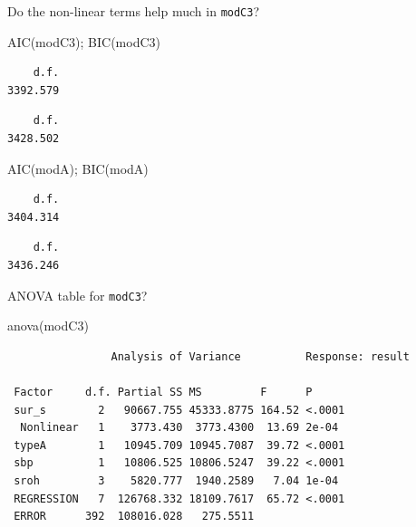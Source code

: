 \documentclass[
  ignorenonframetext,
]{beamer}
\newenvironment{Shaded}{\begin{snugshade}}{\end{snugshade}}
\newcommand{\FunctionTok}[1]{\textcolor[rgb]{0.00,0.00,0.00}{#1}}
\newcommand{\NormalTok}[1]{#1}
\begin{document}
\begin{frame}[fragile]{Do the non-linear terms help much in
\texttt{modC3}?}
\protect\hypertarget{do-the-non-linear-terms-help-much-in-modc3}{}
\begin{Shaded}
\begin{Highlighting}[]
\FunctionTok{AIC}\NormalTok{(modC3); }\FunctionTok{BIC}\NormalTok{(modC3)}
\end{Highlighting}
\end{Shaded}

\begin{verbatim}
    d.f. 
3392.579 
\end{verbatim}

\begin{verbatim}
    d.f. 
3428.502 
\end{verbatim}

\begin{Shaded}
\begin{Highlighting}[]
\FunctionTok{AIC}\NormalTok{(modA); }\FunctionTok{BIC}\NormalTok{(modA)}
\end{Highlighting}
\end{Shaded}

\begin{verbatim}
    d.f. 
3404.314 
\end{verbatim}

\begin{verbatim}
    d.f. 
3436.246 
\end{verbatim}
\end{frame}

\begin{frame}[fragile]{ANOVA table for \texttt{modC3}?}
\protect\hypertarget{anova-table-for-modc3}{}
\begin{Shaded}
\begin{Highlighting}[]
\FunctionTok{anova}\NormalTok{(modC3)}
\end{Highlighting}
\end{Shaded}

\begin{verbatim}
                Analysis of Variance          Response: result 

 Factor     d.f. Partial SS MS         F      P     
 sur_s        2   90667.755 45333.8775 164.52 <.0001
  Nonlinear   1    3773.430  3773.4300  13.69 2e-04 
 typeA        1   10945.709 10945.7087  39.72 <.0001
 sbp          1   10806.525 10806.5247  39.22 <.0001
 sroh         3    5820.777  1940.2589   7.04 1e-04 
 REGRESSION   7  126768.332 18109.7617  65.72 <.0001
 ERROR      392  108016.028   275.5511              
\end{verbatim}
\end{frame}
\end{document}
